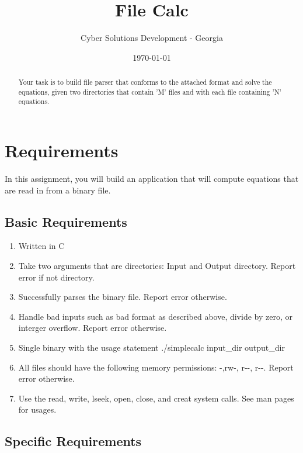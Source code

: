 \documentclass[letterpaper,12pt]{article}
\begin{document}
	
	\title{File Calc}
	\author{Cyber Solutions Development - Georgia}
	\date{\today}
	\maketitle
	
	\begin{abstract}
		Your task is to build file parser that conforms to the attached format and solve the equations, given two directories that contain 'M' files and with each file containing 'N' equations.
	\end{abstract}
	
	
	\section{Requirements}
	
	In this assignment, you will build an application that will compute equations that are read in from a binary file.
	
	\subsection{Basic Requirements}
		\begin{enumerate}
			\item Written in C
			\item Take two arguments that are directories: Input and Output directory. Report error if not directory.
			\item Successfully parses the binary file. Report error otherwise.
			\item Handle bad inputs such as bad format as described above, divide by zero, or interger overflow. Report error otherwise.
			\item Single binary with the usage statement ./simplecalc input\_dir output\_dir	
			\item All files should have the following memory permissions: -,rw-, r-\--, r-\--. Report error otherwise.
			\item Use the read, write, lseek, open, close, and creat system calls. See man pages for usages. 
	\end{enumerate}
	
	\subsection{Specific Requirements}
\end{document}
